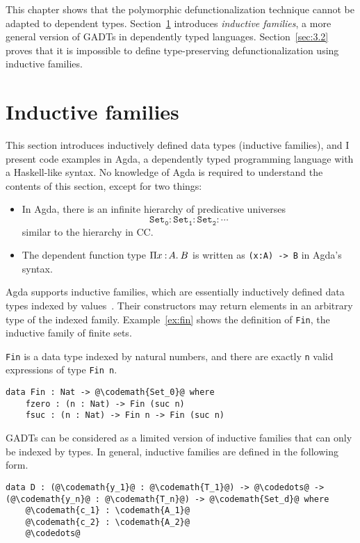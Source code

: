 
This chapter shows that the polymorphic defunctionalization technique cannot be adapted to dependent types. Section~\ref{sec:3.1} introduces \textit{inductive families}, a more general version of GADTs in dependently typed languages. Section~\ref{sec:3.2} proves that it is impossible to define type-preserving defunctionalization using inductive families.

\section{Inductive families}
\label{sec:3.1}

This section introduces inductively defined data types (inductive families), and I present code examples in Agda, a dependently typed programming language with a Haskell-like syntax. No knowledge of Agda is required to understand the contents of this section, except for two things:
\begin{itemize}
  \item In Agda, there is an infinite hierarchy of predicative universes \[ \mathtt{Set_0 : Set_1 : Set_2 : \cdots} \] similar to the hierarchy in CC.
  \item The dependent function type $\Pi x\mkern1.5mu{\hspace{0.5mm}{:}\hspace{0.5mm}} A.\hspace{0.8mm}B$ is written as \texttt{(x:A) -> B} in Agda's syntax.
\end{itemize}

Agda supports inductive families, which are essentially inductively defined data types indexed by values~\cite{AgdaDoc}. Their constructors may return elements in an arbitrary type of the indexed family. Example~\ref{ex:fin} shows the definition of \texttt{Fin}, the inductive family of finite sets.

\begin{exmp} \texttt{Fin} is a data type indexed by natural numbers, and there are exactly \texttt{n} valid expressions of type \texttt{Fin n}.
\begin{lstlisting}[escapechar=@]
data Fin : Nat -> @\codemath{Set_0}@ where
    fzero : (n : Nat) -> Fin (suc n)
    fsuc : (n : Nat) -> Fin n -> Fin (suc n)
\end{lstlisting}
\label{ex:fin}
\end{exmp}
GADTs can be considered as a limited version of inductive families that can only be indexed by types. In general, inductive families are defined in the following form.
\begin{lstlisting}[escapechar=@]
data D : (@\codemath{y_1}@ : @\codemath{T_1}@) -> @\codedots@ -> (@\codemath{y_n}@ : @\codemath{T_n}@) -> @\codemath{Set_d}@ where
    @\codemath{c_1} : \codemath{A_1}@
    @\codemath{c_2} : \codemath{A_2}@
    @\codedots@ 
\end{lstlisting}

